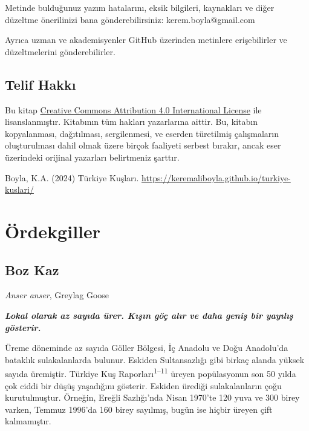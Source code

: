 \documentclass[
  letterpaper,
  DIV=11,
  numbers=noendperiod]{scrreprt}
\begin{document}
Metinde bulduğunuz yazım hatalarını, eksik bilgileri, kaynakları ve
diğer düzeltme önerilinizi bana gönderebilirsiniz: kerem.boyla@gmail.com

Ayrıca uzman ve akademisyenler GitHub üzerinden metinlere erişebilirler
ve düzeltmelerini gönderebilirler.

\hypertarget{telif-hakkux131}{%
\section*{Telif Hakkı}\label{telif-hakkux131}}


Bu kitap \href{https://creativecommons.org/licenses/by/4.0/}{Creative
Commons Attribution 4.0 International License} ile lisanslanmıştır.
Kitabının tüm hakları yazarlarına aittir. Bu, kitabın kopyalanması,
dağıtılması, sergilenmesi, ve eserden türetilmiş çalışmaların
oluşturulması dahil olmak üzere birçok faaliyeti serbest bırakır, ancak
eser üzerindeki orijinal yazarları belirtmeniz şarttır.

Boyla, K.A. (2024) Türkiye Kuşları.
\url{https://keremaliboyla.github.io/turkiye-kuslari/}


\hypertarget{uxf6rdekgiller}{%
\chapter{Ördekgiller}\label{uxf6rdekgiller}}

\hypertarget{boz-kaz}{%
\section{Boz Kaz}\label{boz-kaz}}

\emph{Anser anser}, Greylag Goose

\textbf{\emph{Lokal olarak az sayıda ürer. Kışın göç alır ve daha geniş
bir yayılış gösterir.}}

Üreme döneminde az sayıda Göller Bölgesi, İç Anadolu ve Doğu Anadolu'da
bataklık sulakalanlarda bulunur. Eskiden Sultansazlığı gibi birkaç
alanda yüksek sayıda üremiştir. Türkiye Kuş
Raporları\textsuperscript{1--11} üreyen popülasyonun son 50 yılda çok
ciddi bir düşüş yaşadığını gösterir. Eskiden ürediği sulakalanların çoğu
kurutulmuştur. Örneğin, Ereğli Sazlığı'nda Nisan 1970'te 120 yuva ve 300
birey varken, Temmuz 1996'da 160 birey sayılmış, bugün ise hiçbir üreyen
çift kalmamıştır.
\end{document}
